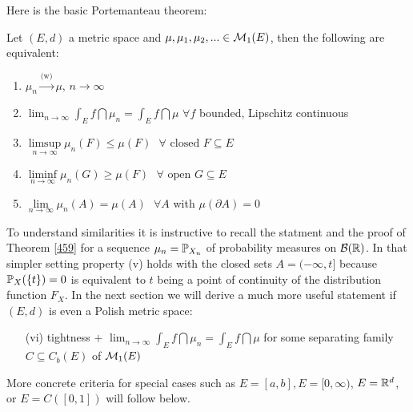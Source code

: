 Here is the basic Portemanteau theorem:
\begin{lAussageWerkzeug}
\begin{theorem}\label{portemanteau}
	Let $(E,d)$ a metric space and $\mu,\mu_1,\mu_2,...\in \cM_1(E)$, then the following are equivalent:
	\begin{enumerate}[label=(\roman*)]
		\item $\mu_n \overset{\text{(w)}}{\longrightarrow} \mu,\, n\to\infty$
		\item $\lim_{n\to\infty} \int_E f \dint \mu_n = \int_E f \dint \mu$\:\: $\forall f$ bounded, Lipschitz continuous
		\item $\limsup\limits_{n\to\infty}\mu_n(F) \leq \mu(F) \:\:\: \forall \text{ closed }F\subseteq E$
		\item $\liminf\limits_{n\to\infty}\mu_n(G) \geq \mu(F) \:\:\: \forall \text{ open }G\subseteq E$
		\item $\lim\limits_{n\to\infty}\mu_n(A) = \mu(A) \:\:\:\forall A$ with $\mu(\partial A)=0$
	\end{enumerate}
\end{theorem}
\end{lAussageWerkzeug}
To understand similarities it is instructive to recall the statment and the proof of Theorem \ref{459} for a sequence $\mu_n=\P_{X_n}$ of probability measures on $\mathcal B(\R)$. In that simpler setting property (v) holds with the closed sets
 $A=(-\infty,t]$ because $\P_X(\{t\})=0$ is equivalent to $t$ being a point of continuity of the distribution function $F_X$. In the next section we will derive a much more useful statement if $(E,d)$ is even a Polish metric space:
 \begin{lwarnhinweis}
	\begin{itemize}
		\item[(vi)] tightness $+$ $\lim_{n\to\infty} \int_E f\dint \mu_n= \int_E f \dint \mu$ for some separating family $C\subseteq C_b(E)$ of $\cM_1(E)$
	\end{itemize}
	\end{lwarnhinweis}
More concrete criteria for special cases such as $E=[a,b], E=[0,\infty)$, $E=\R^d$, or $E=C([0,1])$ will follow below.



